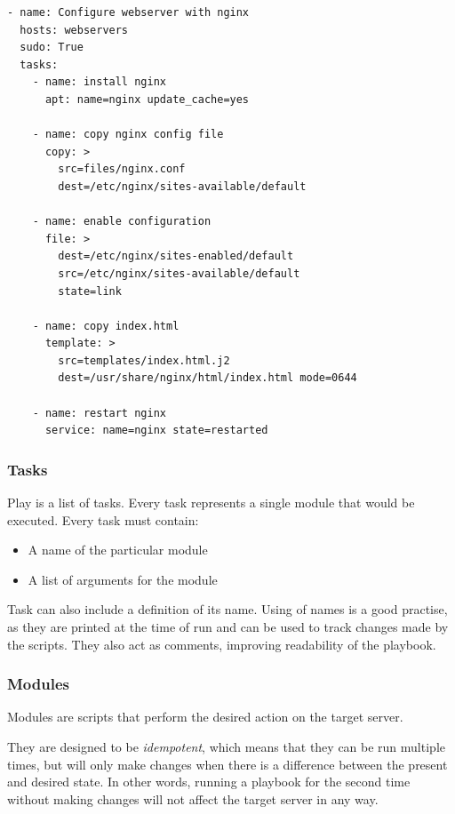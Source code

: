 \begin{lstlisting}
- name: Configure webserver with nginx
  hosts: webservers
  sudo: True
  tasks:
    - name: install nginx
      apt: name=nginx update_cache=yes

    - name: copy nginx config file
      copy: >
        src=files/nginx.conf
        dest=/etc/nginx/sites-available/default

    - name: enable configuration
      file: >
        dest=/etc/nginx/sites-enabled/default
        src=/etc/nginx/sites-available/default
        state=link

    - name: copy index.html
      template: >
        src=templates/index.html.j2
        dest=/usr/share/nginx/html/index.html mode=0644

    - name: restart nginx
      service: name=nginx state=restarted
\end{lstlisting}



\subsubsection*{Tasks}

Play is a list of tasks. Every task represents a single module that would be executed. Every task must contain:
\begin{itemize}
  \item{A name of the particular module}
  \item{A list of arguments for the module}
\end{itemize}

Task can also include a definition of its name. Using of names is a good practise, as they are printed at the time of run and can be used to track changes made by the scripts. They also act as comments, improving readability of the playbook.

\subsubsection*{Modules}

Modules are scripts that perform the desired action on the target server.

They are designed to be \emph{idempotent}, which means that they can be run multiple times, but will only make changes when there is a difference between the present and desired state. In other words, running a playbook for the second time without making changes will not affect the target server in any way.

